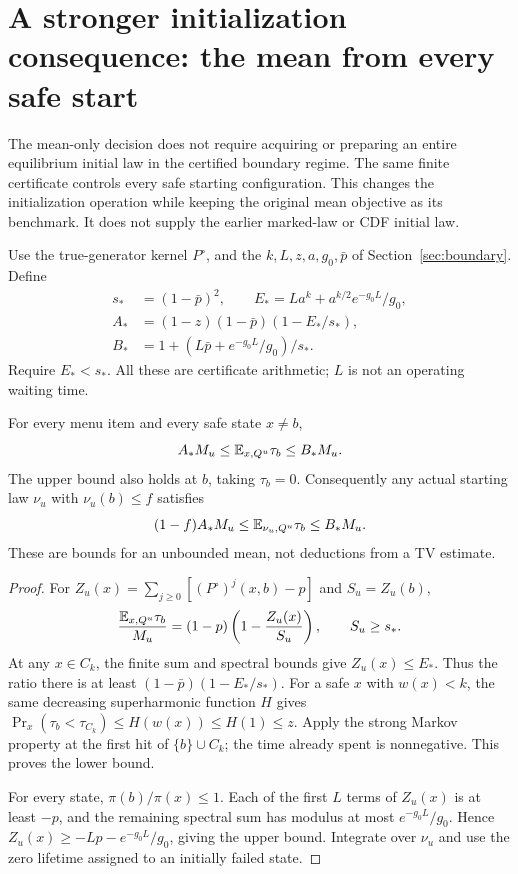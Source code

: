 \section{A stronger initialization consequence: the mean from every safe start}
\label{sec:anystart}
The mean-only decision does not require acquiring or preparing an entire
equilibrium initial law in the certified boundary regime. The same finite
certificate controls every safe starting configuration. This changes the
initialization operation while keeping the original mean objective as its
benchmark. It does not supply the earlier marked-law or CDF initial law.

Use the true-generator kernel $P^\circ$, and the $k,L,z,a,g_0,\bar p$
of Section~\ref{sec:boundary}. Define
\begin{align}
 s_*&=(1-\bar p)^2,\qquad
 E_* = La^k+a^{k/2}e^{-g_0L}/g_0,\\
 A_*&=(1-z)(1-\bar p)(1-E_*/s_*),\\
 B_*&=1+(L\bar p+e^{-g_0L}/g_0)/s_*.
 \label{eq:safestartconstants}
\end{align}
Require $E_*<s_*$. All these are certificate arithmetic; $L$ is not an
operating waiting time.

\begin{theorem}
For every menu item and every safe state $x\ne b$,
\begin{equation}
 A_* M_u\le\mathbb E_{x,Q^u}\tau_b\le B_* M_u.
 \label{eq:allsafemean}
\end{equation}
The upper bound also holds at $b$, taking $\tau_b=0$. Consequently any
actual starting law $\nu_u$ with $\nu_u(b)\le f$ satisfies
\begin{equation}
 (1-f)A_* M_u\le\mathbb E_{\nu_u,Q^u}\tau_b\le B_*M_u.
 \label{eq:imperfectsafemean}
\end{equation}
These are bounds for an unbounded mean, not deductions from a TV estimate.
\end{theorem}
\begin{proof}
For $Z_u(x)=\sum_{j\ge0}[(P^\circ)^j(x,b)-p]$ and $S_u=Z_u(b)$,
\[
 \frac{\mathbb E_{x,Q^u}\tau_b}{M_u}
 =(1-p)\left(1-\frac{Z_u(x)}{S_u}\right),\qquad S_u\ge s_*.
\]
At any $x\in C_k$, the finite sum and spectral bounds give
$Z_u(x)\le E_*$. Thus the ratio there is at least
$(1-\bar p)(1-E_*/s_*)$.
For a safe $x$ with $w(x)<k$, the same decreasing superharmonic
function $H$ gives
$\Pr_x(\tau_b<\tau_{C_k})\le H(w(x))\le H(1)\le z$.
Apply the strong Markov property at the first hit of $\{b\}\cup C_k$;
the time already spent is nonnegative. This proves the lower bound.

For every state, $\pi(b)/\pi(x)\le1$. Each of the first $L$ terms of
$Z_u(x)$ is at least $-p$, and the remaining spectral sum has modulus
at most $e^{-g_0L}/g_0$. Hence
$Z_u(x)\ge-Lp-e^{-g_0L}/g_0$, giving the upper bound.
Integrate over $\nu_u$ and use the zero lifetime assigned to an
initially failed state.
\end{proof}

